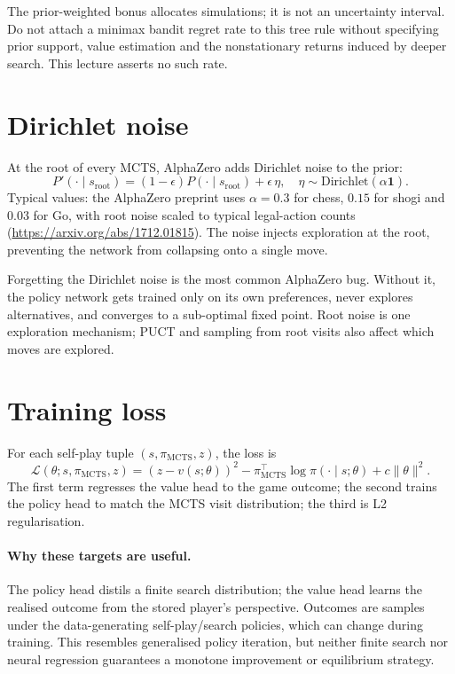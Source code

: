 \documentclass[11pt,oneside]{scrbook}
\begin{document}
\begin{remark}
The prior-weighted bonus allocates simulations; it is not an uncertainty
interval. Do not attach a minimax bandit regret rate to this tree rule
without specifying prior support, value estimation and the nonstationary
returns induced by deeper search. This lecture asserts no such rate.
\end{remark}

\section{Dirichlet noise}

At the root of every MCTS, AlphaZero adds Dirichlet noise to the prior:
\[
P'(\cdot \mid s_{\mathrm{root}}) = (1 - \epsilon) P(\cdot \mid s_{\mathrm{root}}) + \epsilon\, \eta, \quad \eta \sim \mathrm{Dirichlet}(\alpha \mathbf{1}).
\]
Typical values: the AlphaZero preprint uses $\alpha=0.3$ for chess, $0.15$ for shogi
and $0.03$ for Go, with root noise scaled to typical legal-action counts
(\url{https://arxiv.org/abs/1712.01815}). The noise injects exploration at the root, preventing the
network from collapsing onto a single move.

\begin{pitfall}
Forgetting the Dirichlet noise is the most common AlphaZero bug. Without
it, the policy network gets trained only on its own preferences, never
explores alternatives, and converges to a sub-optimal fixed point. Root noise is one exploration mechanism; PUCT and sampling from
root visits also affect which moves are explored.
\end{pitfall}

\section{Training loss}

\begin{theorem}
For each self-play tuple $(s, \pi_{\mathrm{MCTS}}, z)$, the loss is
\[
\mathcal{L}(\theta; s, \pi_{\mathrm{MCTS}}, z) = (z - v(s; \theta))^2 - \pi_{\mathrm{MCTS}}^\top \log \pi(\cdot \mid s; \theta) + c \|\theta\|^2.
\]
The first term regresses the value head to the game outcome; the second
trains the policy head to match the MCTS visit distribution; the third is
L2 regularisation.
\end{theorem}

\paragraph{Why these targets are useful.}
The policy head distils a finite search distribution; the value head learns
the realised outcome from the stored player's perspective. Outcomes are
samples under the data-generating self-play/search policies, which can
change during training. This resembles generalised policy iteration, but
neither finite search nor neural regression guarantees a monotone
improvement or equilibrium strategy.
\end{document}
